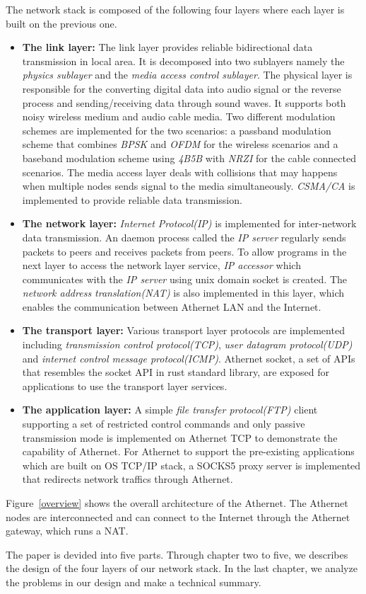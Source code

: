 The network stack is composed of the following four layers where each layer is built on the previous one.
\begin{itemize}
	\item \textbf{The link layer:} The link layer provides reliable bidirectional data transmission in local area.
	      It is decomposed into two sublayers namely the \emph{physics sublayer} and the \emph{media access control sublayer}.
	      The physical layer is responsible for the converting digital data into audio signal or the reverse process and sending/receiving data through sound waves.
	      It supports both noisy wireless medium and audio cable media.
	      Two different modulation schemes are implemented for the two scenarios: a passband modulation scheme that combines \emph{BPSK} and \emph{OFDM} for the wireless scenarios
	      and a baseband modulation scheme using \emph{4B5B} with \emph{NRZI} for the cable connected scenarios.
	      The media access layer deals with collisions that may happens when multiple nodes sends signal to the media simultaneously.
	      \emph{CSMA/CA} is implemented to provide reliable data transmission.
	\item \textbf{The network layer:} \emph{Internet Protocol(IP)} is implemented for inter-network data transmission.
	      An daemon process called the \emph{IP server} regularly sends packets to peers and receives packets from peers.
	      To allow programs in the next layer to access the network layer service, \emph{IP accessor} which communicates with the \emph{IP server} using unix domain socket is created.
	      The \emph{network address translation(NAT)} is also implemented in this layer, which enables the communication between Athernet LAN and the Internet.
	\item \textbf{The transport layer:} Various transport layer protocols are implemented including \emph{transmission control protocol(TCP)}, \emph{user datagram protocol(UDP)} and \emph{internet control message protocol(ICMP)}.
	      Athernet socket, a set of APIs that resembles the socket API in rust standard library, are exposed for applications to use the transport layer services.
	\item \textbf{The application layer:}
	      A simple \emph{file transfer protocol(FTP)} client supporting a set of restricted control commands and only passive transmission mode
	      is implemented on Athernet TCP to demonstrate the capability of Athernet.
          For Athernet to support the pre-existing applications which are built on OS TCP/IP stack,
	      a SOCKS5 proxy server is implemented that redirects network traffics through Athernet.
\end{itemize}
Figure~\ref{overview} shows the overall architecture of the Athernet. The Athernet nodes are interconnected and can connect to the Internet through the Athernet gateway, which runs a NAT.\par
The paper is devided into five parts. Through chapter two to five, we describes the design of the four layers of our network stack. In the last chapter, we analyze the problems in our design and make a technical summary.
